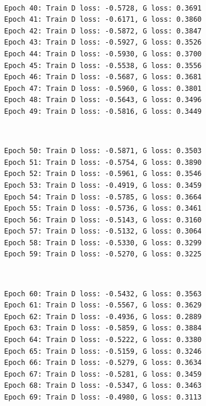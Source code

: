 \documentclass[11pt]{article}
\begin{document}
    \begin{center}
    \end{center}
    { \hspace*{\fill} \\}
    
    \begin{Verbatim}[commandchars=\\\{\}]
Epoch 40: Train D loss: -0.5728, G loss: 0.3691
Epoch 41: Train D loss: -0.6171, G loss: 0.3860
Epoch 42: Train D loss: -0.5872, G loss: 0.3847
Epoch 43: Train D loss: -0.5927, G loss: 0.3526
Epoch 44: Train D loss: -0.5930, G loss: 0.3700
Epoch 45: Train D loss: -0.5538, G loss: 0.3556
Epoch 46: Train D loss: -0.5687, G loss: 0.3681
Epoch 47: Train D loss: -0.5960, G loss: 0.3801
Epoch 48: Train D loss: -0.5643, G loss: 0.3496
Epoch 49: Train D loss: -0.5816, G loss: 0.3449

    \end{Verbatim}

    \begin{center}
    \end{center}
    { \hspace*{\fill} \\}
    
    \begin{Verbatim}[commandchars=\\\{\}]
Epoch 50: Train D loss: -0.5871, G loss: 0.3503
Epoch 51: Train D loss: -0.5754, G loss: 0.3890
Epoch 52: Train D loss: -0.5961, G loss: 0.3546
Epoch 53: Train D loss: -0.4919, G loss: 0.3459
Epoch 54: Train D loss: -0.5785, G loss: 0.3664
Epoch 55: Train D loss: -0.5736, G loss: 0.3461
Epoch 56: Train D loss: -0.5143, G loss: 0.3160
Epoch 57: Train D loss: -0.5132, G loss: 0.3064
Epoch 58: Train D loss: -0.5330, G loss: 0.3299
Epoch 59: Train D loss: -0.5270, G loss: 0.3225

    \end{Verbatim}

    \begin{center}
    \end{center}
    { \hspace*{\fill} \\}
    
    \begin{Verbatim}[commandchars=\\\{\}]
Epoch 60: Train D loss: -0.5432, G loss: 0.3563
Epoch 61: Train D loss: -0.5567, G loss: 0.3629
Epoch 62: Train D loss: -0.4936, G loss: 0.2889
Epoch 63: Train D loss: -0.5859, G loss: 0.3884
Epoch 64: Train D loss: -0.5222, G loss: 0.3380
Epoch 65: Train D loss: -0.5159, G loss: 0.3246
Epoch 66: Train D loss: -0.5279, G loss: 0.3634
Epoch 67: Train D loss: -0.5281, G loss: 0.3459
Epoch 68: Train D loss: -0.5347, G loss: 0.3463
Epoch 69: Train D loss: -0.4980, G loss: 0.3113

    \end{Verbatim}
\end{document}
